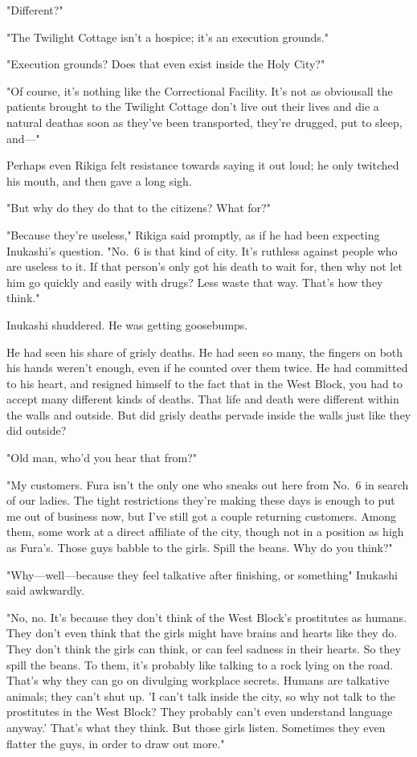 "Different?"

"The Twilight Cottage isn't a hospice; it's an execution grounds."

"Execution grounds? Does that even exist inside the Holy City?"

"Of course, it's nothing like the Correctional Facility. It's not as
obvious\el all the patients brought to the Twilight Cottage don't live
out their lives and die a natural death\el as soon as they've been
transported, they're drugged, put to sleep, and---"

Perhaps even Rikiga felt resistance towards saying it out loud; he only
twitched his mouth, and then gave a long sigh.

"But why do they do that to the citizens? What for?"

"Because they're useless," Rikiga said promptly, as if he had been
expecting Inukashi's question. "No.~6 is that kind of city. It's
ruthless against people who are useless to it. If that person's only got
his death to wait for, then why not let him go quickly and easily with
drugs? Less waste that way. That's how they think."

Inukashi shuddered. He was getting goosebumps.

He had seen his share of grisly deaths. He had seen so many, the fingers
on both his hands weren't enough, even if he counted over them twice. He
had committed to his heart, and resigned himself to the fact that in the
West Block, you had to accept many different kinds of deaths. That life
and death were different within the walls and outside. But did grisly
deaths pervade inside the walls just like they did outside?

"Old man, who'd you hear that from?"

"My customers. Fura isn't the only one who sneaks out here from No.~6 in
search of our ladies. The tight restrictions they're making these days
is enough to put me out of business now, but I've still got a couple
returning customers. Among them, some work at a direct affiliate of the
city, though not in a position as high as Fura's. Those guys babble to
the girls. Spill the beans. Why do you think?"

"Why---well---because they feel talkative after finishing, or something\el "
Inukashi said awkwardly.

"No, no. It's because they don't think of the West Block's prostitutes
as humans. They don't even think that the girls might have brains and
hearts like they do. They don't think the girls can think, or can feel
sadness in their hearts. So they spill the beans. To them, it's probably
like talking to a rock lying on the road. That's why they can go on
divulging workplace secrets. Humans are talkative animals; they can't
shut up. 'I can't talk inside the city, so why not talk to the
prostitutes in the West Block? They probably can't even understand
language anyway.' That's what they think. But those girls listen.
Sometimes they even flatter the guys, in order to draw out more."

